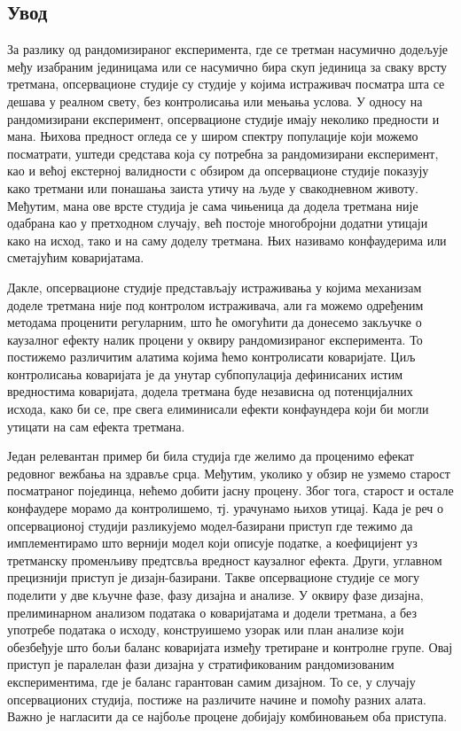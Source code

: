 \documentclass[12pt, a4paper]{article}
\begin{document}
\subsection{Увод}
За разлику од рандомизираног експеримента, где се третман насумично додељује међу изабраним јединицама или се насумично бира скуп јединица за сваку врсту третмана, опсервационе студије су студије у којима истраживач посматра шта се дешава у реалном свету, без контролисања или мењања услова. У односу на рандомизирани експеримент, опсервационе студије имају неколико предности и мана. Њихова предност огледа се у широм спектру популације који можемо посматрати, уштеди средстава која су потребна за рандомизирани експеримент, као и већој екстерној валидности с обзиром да опсервационе студије показују како третмани или понашања заиста утичу на људе у свакодневном животу. Међутим, мана ове врсте студија је сама чињеница да додела третмана није одабрана као у претходном случају, већ постоје многобројни додатни утицаји како на исход, тако и на саму доделу третмана. Њих називамо конфаудерима или сметајућим коваријатама. 

Дакле, опсервационе студије представљају истраживања у којима механизам доделе третмана није под контролом истраживача, али га можемо одређеним методама проценити регуларним, што ће омогућити да донесемо закључке о каузалног ефекту налик процени у оквиру рандомизираног експеримента. То постижемо различитим алатима којима ћемо контролисати коваријате. Циљ контролисања коваријата је да унутар субпопулација дефинисаних истим вредностима коваријата, додела третмана буде независна од потенцијалних исхода, како би се, пре свега елиминисали ефекти конфаундера који би могли утицати на сам ефекта третмана.

Један релевантан пример би била студија где желимо да проценимо ефекат редовног вежбања на здравље срца. Међутим, уколико у обзир не узмемо старост посматраног појединца, нећемо добити јасну процену. Због тога, старост и остале конфаудере морамо да контролишемо, тј. урачунамо њихов утицај. 
Када је реч о опсервационој студији разликујемо модел-базирани приступ где тежимо да имплементирамо што вернији модел који описује податке, а коефицијент уз третманску променљиву предтсвља вредност каузалног ефекта. Други, углавном прецизнији приступ је дизајн-базирани. Такве опсервационе студије се могу поделити у две кључне фазе, фазу дизајна и анализе. У оквиру фазе дизајна, прелиминарном анализом података о коваријатама и додели третмана, а без употребе података о исходу, конструишемо узорак или план анализе који обезбеђује што бољи баланс коваријата између третиране и контролне групе. Овај приступ је паралелан фази дизајна у стратификованим рандомизованим експериментима, где је баланс гарантован самим дизајном. То се, у случају опсервационих студија, постиже на различите начине и помоћу разних алата. 
Важно је нагласити да се најбоље процене добијају комбиновањем оба приступа.
\end{document}
